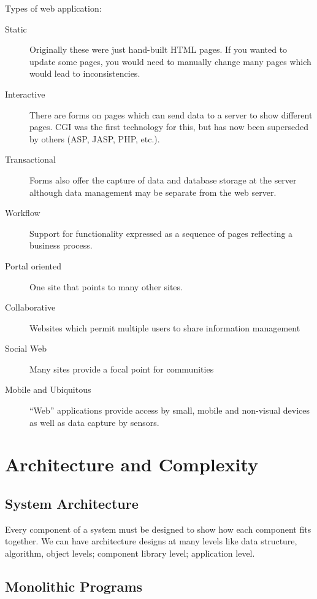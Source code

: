 Types of web application:
\begin{description}
	\item[Static] Originally these were just hand-built HTML pages.
	      If you wanted to update some pages, you would need to manually change many pages which would lead to inconsistencies.
	\item[Interactive] There are forms on pages which can send data to a server to show different pages.
	      CGI was the first technology for this, but has now been superseded by others (ASP, JASP, PHP, etc.).
	\item[Transactional] Forms also offer the capture of data and database storage at the server although data management may be separate from the web server.
	\item[Workflow] Support for functionality expressed as a sequence of pages reflecting a business process.
	\item[Portal oriented] One site that points to many other sites.
	\item[Collaborative] Websites which permit multiple users to share information management
	\item[Social Web] Many sites provide a focal point for communities
	\item[Mobile and Ubiquitous] ``Web'' applications provide access by small, mobile and non-visual devices as well as data capture by sensors.
\end{description}

\section{Architecture and Complexity}\label{sec:architecture_and_complexity}

\subsection{System Architecture}\label{sub:system_architecure}

Every component of a system must be designed to show how each component fits together.
We can have architecture designs at many levels like data structure, algorithm, object levels; component library level; application level.

\subsection{Monolithic Programs}\label{sub:monolithic_programs}

